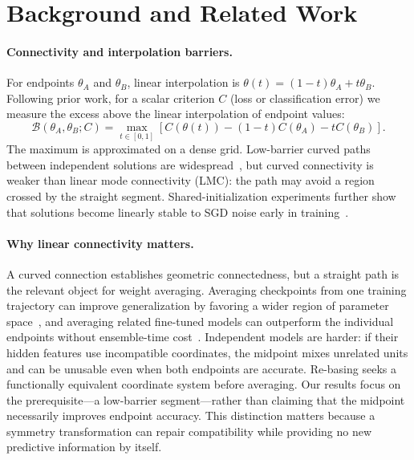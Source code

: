 \documentclass{article}
\newcommand{\barrier}{\mathcal{B}}
\begin{document}
\section{Background and Related Work}

\paragraph{Connectivity and interpolation barriers.}
For endpoints $\theta_A$ and $\theta_B$, linear interpolation is
$\theta(t)=(1-t)\theta_A+t\theta_B$.  Following prior work, for a scalar
criterion $C$ (loss or classification error) we measure the excess above the
linear interpolation of endpoint values:
\begin{equation}
\barrier(\theta_A,\theta_B;C)=
\max_{t\in[0,1]}\left[C(\theta(t))-
(1-t)C(\theta_A)-tC(\theta_B)\right].
\label{eq:barrier}
\end{equation}
The maximum is approximated on a dense grid.  Low-barrier curved paths between
independent solutions are widespread~\citep{draxler2018essentially,garipov2018loss},
but curved connectivity is weaker than linear mode connectivity (LMC): the path
may avoid a region crossed by the straight segment.  Shared-initialization
experiments further show that solutions become linearly stable to SGD noise
early in training~\citep{frankle2020linear}.

\paragraph{Why linear connectivity matters.}
A curved connection establishes geometric connectedness, but a straight path
is the relevant object for weight averaging.  Averaging checkpoints from one
training trajectory can improve generalization by favoring a wider region of
parameter space~\citep{izmailov2018averaging}, and averaging related fine-tuned
models can outperform the individual endpoints without ensemble-time
cost~\citep{wortsman2022model}.  Independent models are harder: if their hidden
features use incompatible coordinates, the midpoint mixes unrelated units and
can be unusable even when both endpoints are accurate.  Re-basing seeks a
functionally equivalent coordinate system before averaging.  Our results focus
on the prerequisite---a low-barrier segment---rather than claiming that the
midpoint necessarily improves endpoint accuracy.  This distinction matters
because a symmetry transformation can repair compatibility while providing no
new predictive information by itself.
\end{document}
